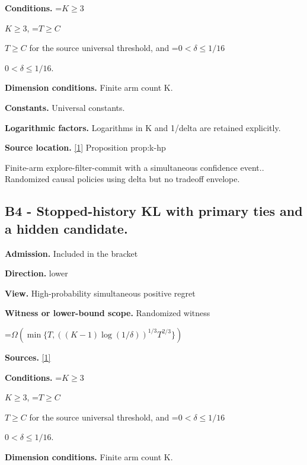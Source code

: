 \documentclass[10pt,a4paper]{article}
\newcommand{\AtlasMath}[1]{\par\begingroup\centering\setbox0=\hbox{$\displaystyle #1$}\ifdim\wd0>1.4\linewidth\typeout{ATLAS WIDE FORMULA: \the\wd0}\fi\ifdim\wd0>\linewidth\resizebox{\linewidth}{!}{\box0}\else\box0\fi\par\endgroup}
\newcommand{\AtlasInlineMath}[1]{\begingroup\setbox0=\hbox{$#1$}\ifdim\wd0>.4\linewidth\endgroup\AtlasMath{#1}\else\endgroup$#1$\fi}
\begin{document}
\textbf{Conditions.} \AtlasInlineMath{K\ge3}, \AtlasInlineMath{T\ge C} for the source universal threshold, and \AtlasInlineMath{0<\delta\le1/16}.



\textbf{Dimension conditions.} Finite arm count K.



\textbf{Constants.} Universal constants.



\textbf{Logarithmic factors.} Logarithms in K and 1/delta are retained explicitly.



\textbf{Source location.} \href{https://github.com/WU-Wendao/Colombo/blob/main/colombo_sensorium/Complexity_altas/data/sources/colombo/U07/manuscript.pdf}{[1]} Proposition prop:k-hp



Finite-arm explore-filter-commit with a simultaneous confidence event.. Randomized causal policies using delta but no tradeoff envelope.



\subsection{B4 - Stopped-history KL with primary ties and a hidden candidate.}


\textbf{Admission.} Included in the bracket



\textbf{Direction.} lower



\textbf{View.} High-probability simultaneous positive regret



\textbf{Witness or lower-bound scope.} Randomized witness



\AtlasMath{\Omega\!\left(\min\{T,((K-1)\log(1/\delta))^{1/3}T^{2/3}\}\right)}


\textbf{Sources.} \href{https://github.com/WU-Wendao/Colombo/blob/main/colombo_sensorium/Complexity_altas/data/sources/colombo/U07/manuscript.pdf}{[1]}



\textbf{Conditions.} \AtlasInlineMath{K\ge3}, \AtlasInlineMath{T\ge C} for the source universal threshold, and \AtlasInlineMath{0<\delta\le1/16}.



\textbf{Dimension conditions.} Finite arm count K.
\end{document}
